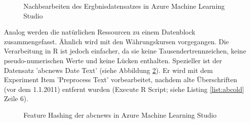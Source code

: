 \begin{figure}[H]
\centering
{}
\caption{Nachbearbeiten des Ergbnisdatensatzes in Azure Machine Learning Studio}
\label{fig:indicesAzure_2}
\end{figure}
Analog werden die natürlichen Ressourcen zu einem Datenblock zusammengefasst. Ähnlich wird mit den Währungskursen vorgegangen. Die Verarbeitung in R ist jedoch einfacher, da sie keine Tausendertrennzeichen, keine pseudo-numerischen Werte und keine Lücken enthalten. 
Spezieller ist der Datensatz 'abcnews \textunderscore Date \textunderscore Text' (siehe Abbildung \ref{fig:abcAzure1}). Er wird mit dem Experiment Item 'Preprocess Text' vorbearbeitet, nachdem alte Überschriften (vor dem 1.1.2011) entfernt wurden (Execute R Script; siehe Listing \ref{list:abcold} Zeile 6). 
\begin{figure}[H]
\centering
{}
\caption{Feature Hashing der abcnews in Azure Machine Learning Studio}
\label{fig:abcAzure1}
\end{figure}
